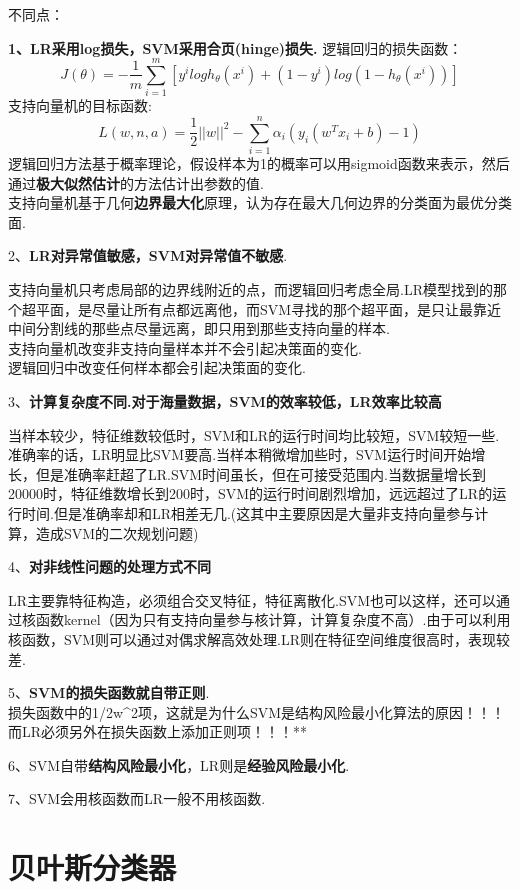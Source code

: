不同点：

\textbf{1、LR采用log损失，SVM采用合页(hinge)损失.} 逻辑回归的损失函数：
\[
J(\theta)=-\frac{1}{m}\sum^m_{i=1}\left[y^{i}logh_{\theta}(x^{i})+ (1-y^{i})log(1-h_{\theta}(x^{i}))\right]
\] 支持向量机的目标函数: \[
L(w,n,a)=\frac{1}{2}||w||^2-\sum^n_{i=1}\alpha_i \left( y_i(w^Tx_i+b)-1\right)
\] ​
逻辑回归方法基于概率理论，假设样本为1的概率可以用sigmoid函数来表示，然后通过\textbf{极大似然估计}的方法估计出参数的值.\\
​
支持向量机基于几何\textbf{边界最大化}原理，认为存在最大几何边界的分类面为最优分类面.

2、\textbf{LR对异常值敏感，SVM对异常值不敏感}.

​
支持向量机只考虑局部的边界线附近的点，而逻辑回归考虑全局.LR模型找到的那个超平面，是尽量让所有点都远离他，而SVM寻找的那个超平面，是只让最靠近中间分割线的那些点尽量远离，即只用到那些支持向量的样本.\\
​ 支持向量机改变非支持向量样本并不会引起决策面的变化.\\
​ 逻辑回归中改变任何样本都会引起决策面的变化.

3、\textbf{计算复杂度不同.对于海量数据，SVM的效率较低，LR效率比较高}

​
当样本较少，特征维数较低时，SVM和LR的运行时间均比较短，SVM较短一些.准确率的话，LR明显比SVM要高.当样本稍微增加些时，SVM运行时间开始增长，但是准确率赶超了LR.SVM时间虽长，但在可接受范围内.当数据量增长到20000时，特征维数增长到200时，SVM的运行时间剧烈增加，远远超过了LR的运行时间.但是准确率却和LR相差无几.(这其中主要原因是大量非支持向量参与计算，造成SVM的二次规划问题)

4、\textbf{对非线性问题的处理方式不同}

​
LR主要靠特征构造，必须组合交叉特征，特征离散化.SVM也可以这样，还可以通过核函数kernel（因为只有支持向量参与核计算，计算复杂度不高）.由于可以利用核函数，SVM则可以通过对偶求解高效处理.LR则在特征空间维度很高时，表现较差.

5、\textbf{SVM的损失函数就自带正则}.\\
​
损失函数中的1/2\textbar{}\textbar{}w\textbar{}\textbar{}^2项，这就是为什么SVM是结构风险最小化算法的原因！！！而LR必须另外在损失函数上添加正则项！！！**

6、SVM自带\textbf{结构风险最小化}，LR则是\textbf{经验风险最小化}.

7、SVM会用核函数而LR一般不用核函数.

\section{贝叶斯分类器}\label{ux8d1dux53f6ux65afux5206ux7c7bux5668}

